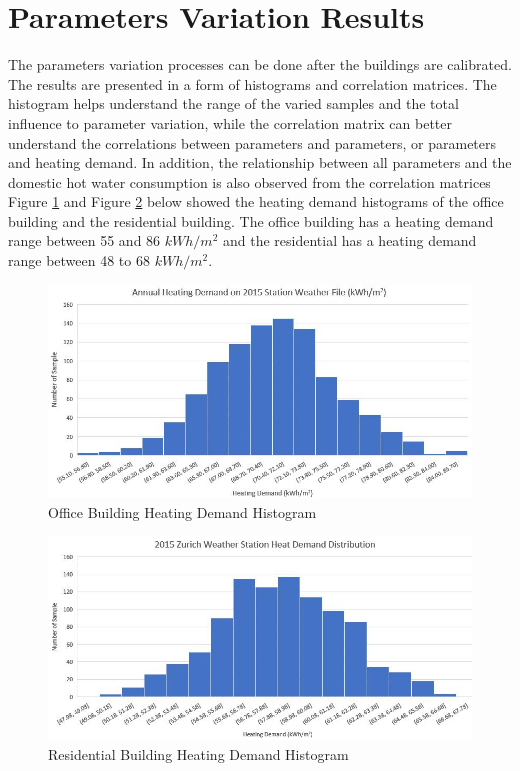 \documentclass[a4paper, oneside]{discothesis}
\begin{document}
	\newpage	
	\section{Parameters Variation Results}

		The parameters variation processes can be done after the buildings are calibrated. The results are presented in a form of histograms and correlation matrices. The histogram helps understand the range of the varied samples and the total influence to parameter variation, while the correlation matrix can better understand the correlations between parameters and parameters, or parameters and heating demand. In addition, the relationship between all parameters and the domestic hot water consumption is also observed from the correlation matrices\\
		
		Figure \ref{fig:Sumatra_StationHistogram} and Figure \ref{fig:Hongg_StationHistogram} below showed the heating demand histograms of the office building and the residential building. The office building has a heating demand range between 55 and 86 $kWh/m^2$ and the residential has a heating demand range between 48 to 68 $kWh/m^2$.\\

	    \begin{figure}[H]
		\centering
		\includegraphics[scale=0.65]{Sumatra_2015Distribution.jpg}
		\caption{Office Building Heating Demand Histogram}
		\label{fig:Sumatra_StationHistogram}
		\end{figure}	

	    \begin{figure}[H]
		\centering
		\includegraphics[scale=0.7]{Hongg_2015Distribution.jpg}
		\caption{Residential Building Heating Demand Histogram}
		\label{fig:Hongg_StationHistogram}
		\end{figure}
\end{document}
